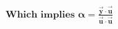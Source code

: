 \documentclass[preview]{standalone}
\begin{document}
\begin{align*}
\textbf{Which implies} \,\, \mathbf{\alpha} = \frac{\mathbf{\vec{y}} \cdot \mathbf{\vec{u}}}{\mathbf{\vec{u}} \cdot \mathbf{\vec{u}}}
\end{align*}
\end{document}
